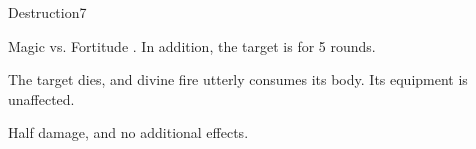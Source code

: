 \begin{spellsection}{Destruction}{7}
\begin{spellheader}
\end{spellheader}
\begin{spellcontent}
    \begin{spelltargetinginfo}
    \end{spelltargetinginfo}
    \begin{spelleffects}
        \begin{spellattack}{Magic vs. Fortitude}
            \spellsuccess {}. In addition, the target is \staggered for 5 rounds.

            \spellcritical The target dies, and divine fire utterly consumes its body. Its equipment is unaffected.

            \spellfailure Half damage, and no additional effects.
        \end{spellattack}
    \end{spelleffects}
\end{spellcontent}
\begin{spellfooter}
\end{spellfooter}
\end{spellsection}

